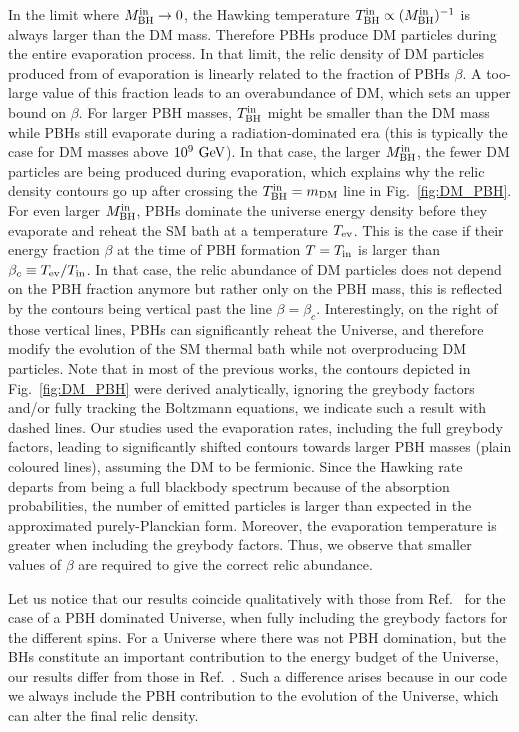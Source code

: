 \documentclass[aps,prd,reprint,twocolumn,preprintnumbers,floatfix,nofootinbib]{revtex4-1}
\newcommand{\mDM}{m_{\rm DM}}
\newcommand{\TBHi}{T_{\rm BH}^{\rm in}}
\newcommand{\MBHi}{M_{\rm BH}^{\rm in}}
\newcommand{\GeV}{\rm GeV}
\begin{document}
In the limit where $\MBHi\to 0$, the Hawking temperature $\TBHi \propto (\MBHi)^{-1}$ is always larger than the DM mass. Therefore PBHs produce DM particles during the entire evaporation process. 
In that limit, the relic density of DM particles produced from of evaporation is linearly related to the fraction of PBHs $\beta$. 
A too-large value of this fraction leads to an overabundance of DM, which sets an upper bound on $\beta$. For larger PBH masses, $\TBHi$ might be smaller than the DM mass while PBHs still evaporate during a radiation-dominated era (this is typically the case for DM masses above $10^9~\GeV$). 
In that case, the larger $\MBHi$, the fewer DM particles are being produced during evaporation, which explains why the relic density contours go up after crossing the $\TBHi=\mDM$ line in Fig.~\ref{fig:DM_PBH}. 
For even larger $\MBHi$, PBHs dominate the universe energy density before they evaporate and reheat the SM bath at a temperature $T_{\rm ev}$. This is the case if their energy fraction $\beta$ at the time of PBH formation $T=T_{\rm in}$ is larger than $\beta_c\equiv T_{\rm ev}/T_{\rm in}$. 
In that case, the relic abundance of DM particles does not depend on the PBH fraction anymore but rather only on the PBH mass, this is reflected by the contours being vertical past the line $\beta=\beta_c$.
Interestingly, on the right of those vertical lines, PBHs can significantly reheat the Universe, and therefore modify the evolution of the SM thermal bath while not overproducing DM particles. 
Note that in most of the previous works, the contours depicted in Fig.~\ref{fig:DM_PBH} were derived analytically, ignoring the greybody factors~\cite{Gondolo:2020uqv} and/or fully tracking the Boltzmann equations, we indicate such a result with dashed lines. 
Our studies used the evaporation rates, including the full greybody factors, leading to significantly shifted contours towards larger PBH masses (plain coloured lines), assuming the DM to be fermionic. 
Since the Hawking rate departs from being a full blackbody spectrum because of the absorption probabilities, the number of emitted particles is larger than expected in the approximated purely-Planckian form. 
Moreover, the evaporation temperature is greater when including the greybody factors. 
Thus, we observe that smaller values of $\beta$ are required to give the correct relic abundance.

Let us notice that our results coincide qualitatively with those from Ref.~\cite{Auffinger:2020afu} for the case of a PBH dominated Universe, when fully including the greybody factors for the different spins. 
For a Universe where there was not PBH domination, but the BHs constitute an important contribution to the energy budget of the Universe, our results differ from those in Ref.~\cite{Auffinger:2020afu}.
Such a difference arises because in our code we always include the PBH contribution to the evolution of the Universe, which can alter the final relic density.
\end{document}
